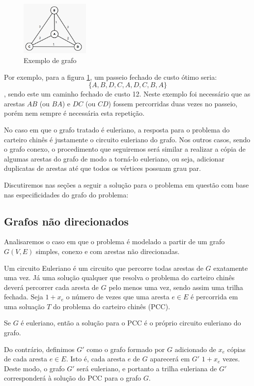 \documentclass{article}
\begin{document}
\begin{figure} 
    \centering
    \includegraphics[width=0.3\textwidth]{graph.png}
	\caption{Exemplo de grafo}
	\label{graph}
\end{figure}

Por exemplo, para a figura \ref{graph}, um passeio fechado de custo ótimo seria: \[ \{A, B, D, C, A, D, C, B, A\} \], sendo este um caminho fechado de custo 12.
Neste exemplo foi necessário que as arestas $AB$ (ou $BA$) e $DC$ (ou $CD$) fossem percorridas duas vezes no passeio, porém nem sempre é necessária esta repetição.

No caso em que o grafo tratado é euleriano, a resposta para o problema do carteiro chinês é justamente o circuito euleriano do grafo.
Nos outros casos, sendo o grafo conexo, o procedimento que seguiremos será similar a realizar a cópia de algumas arestas do grafo de modo a torná-lo euleriano, ou seja, adicionar duplicatas de arestas até que todos os vértices possuam grau par.

Discutiremos nas seções a seguir a solução para o problema em questão com base nas especificidades do grafo do problema:

\subsection{Grafos não direcionados}

Analisaremos o caso em que o problema é modelado a partir de um grafo $G(V, E)$ simples, conexo e com arestas não direcionadas.

Um circuito Euleriano é um circuito que percorre todas arestas de $G$ exatamente uma vez. 
Já uma solução qualquer que resolva o problema do carteiro chinês deverá percorrer cada aresta de $G$ pelo menos uma vez, sendo assim uma trilha fechada.
Seja $1 + x_e$ o número de vezes que uma aresta $e \in E$ é percorrida em uma soluação $T$ do problema do carteiro chinês (PCC).

Se $G$ é euleriano, então a solução para o PCC é o próprio circuito euleriano do grafo.

Do contrário, definimos $G'$ como o grafo formado por $G$ adicionado de $x_e$ cópias de cada aresta $e \in E$. 
Isto é, cada aresta $e$ de $G$ aparecerá em $G'$ $1 + x_e$ vezes.
Deste modo, o grafo $G'$ será euleriano, e portanto a trilha euleriana de $G'$ corresponderá à solução do PCC para o grafo $G$.
\end{document}
